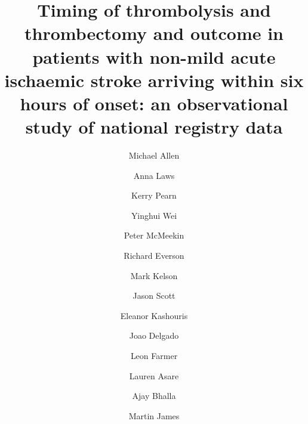 \title{Timing of thrombolysis and thrombectomy and outcome in patients with non-mild acute ischaemic stroke arriving within six hours of onset: an observational study of national registry data}


\renewcommand{\thefootnote}{\fnsymbol{footnote}}

\author[*1,2]{Michael Allen}
\author[1,2]{Anna Laws}
\author[1,2]{Kerry Pearn}
\author[1,2]{Yinghui Wei}
\author[4]{Peter McMeekin}
\author[3]{Richard Everson}
\author[3]{Mark Kelson}
\author[4]{Jason Scott}
\author[4]{Eleanor Kashouris}
\author[1]{Joao Delgado}
\author[1,2]{Leon Farmer}
\author[1,2]{Lauren Asare}
\author[5]{Ajay Bhalla}
\author[1,2]{Martin James}


\date{}